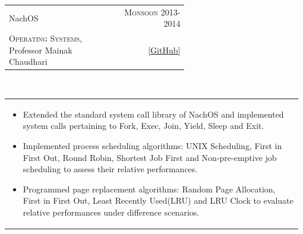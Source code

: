 \documentclass[a4paper]{article} %
\newcommand{\verticalspacing}{-0.25cm}
\newcommand{\bulletspace}{0.7cm}
\newcommand{\projectheadspacing}{6.9cm}
\newcommand{\cproject}[5]{%
    \begin{tabular}{p{0.60\linewidth}r}
        \textcolor{NavyBlue}{\small #2} & \multicolumn{1}{m{ \projectheadspacing{} }}{\raggedleft \small {\textsc{#1}}}\\
        \small {#3} & \small {#4}
    \end{tabular}\\
    \begin{tabular}{p{0.98\linewidth}}
    \vspace{-0.3cm}
        \small{#5}
    \end{tabular}
    \vspace{\verticalspacing{}}
}
\begin{document}
\cproject
    {Monsoon 2013-2014}
    {NachOS}
    {\textsc{Operating Systems}, Professor Mainak Chaudhari}
    {\href{https://github.com/srijanshetty/nachos} {[GitHub]}}
    {%
        \begin{itemize}[leftmargin=\bulletspace{}]
            \item Extended the standard system call library of NachOS and implemented system calls pertaining to Fork, Exec,
                Join, Yield, Sleep and Exit.
            \item Implemented process scheduling algorithms: UNIX Scheduling, First in First Out,
                Round Robin, Shortest Job First and Non-pre-emptive job scheduling to assess their relative performances.
            \item Programmed page replacement algorithms: Random Page Allocation, First in First Out,
                Least Recently Used(LRU) and LRU Clock to evaluate relative performances under difference scenarios.
        \end{itemize}
    }


\end{document}
